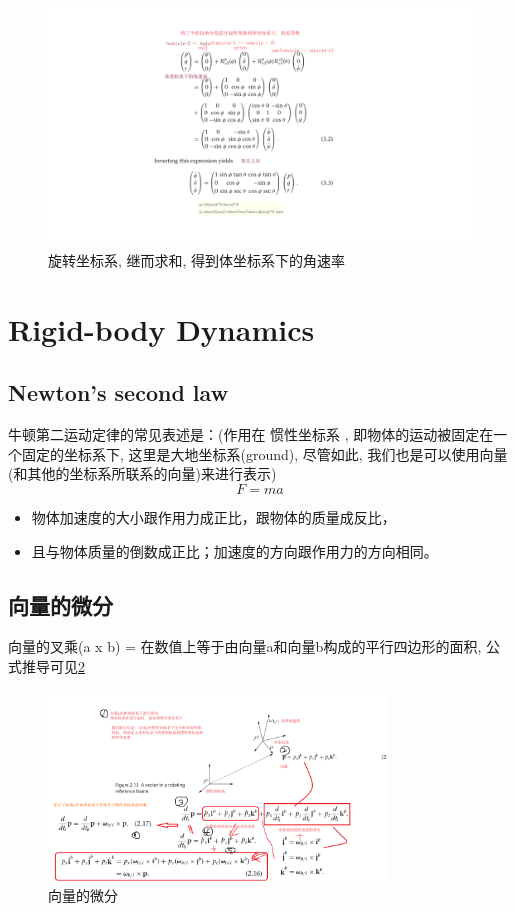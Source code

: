 \documentclass[UTF8,a4paper,10pt,nocolorlinks]{ctexart}
\begin{document}
\begin{figure}[htpb]
  \centering
  \includegraphics[width=\textwidth]{picture/equ_2.png}
  \caption{旋转坐标系, 继而求和, 得到体坐标系下的角速率}
  \label{equ_2}
\end{figure}

\section{Rigid-body Dynamics}
\subsection{Newton's second law}
牛顿第二运动定律的常见表述是：(作用在 惯性坐标系 , 即物体的运动被固定在一个固定的坐标系下, 这里是大地坐标系(ground), 尽管如此, 我们也是可以使用向量(和其他的坐标系所联系的向量)来进行表示)
\begin{equation}
  F = ma \nonumber
\end{equation}
\begin{itemize}
  \item 物体加速度的大小跟作用力成正比，跟物体的质量成反比，
  \item 且与物体质量的倒数成正比；加速度的方向跟作用力的方向相同。
\end{itemize}
\subsection{向量的微分}
向量的叉乘(a x b) = 在数值上等于由向量a和向量b构成的平行四边形的面积, 公式推导可见\ref{2_equ}
\begin{figure}[htpb]
  \centering
  \includegraphics[width=0.8\textwidth]{picture/2_equ.png}
  \caption{向量的微分}
  \label{2_equ}
\end{figure}
\end{document}
